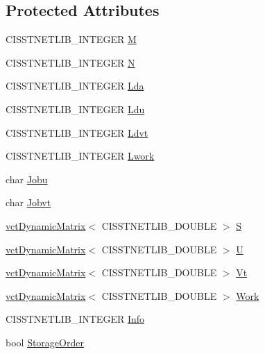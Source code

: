 \subsection*{Protected Attributes}
\begin{DoxyCompactItemize}
\item 
C\+I\+S\+S\+T\+N\+E\+T\+L\+I\+B\+\_\+\+I\+N\+T\+E\+G\+E\+R \hyperlink{classnmr_s_v_d_solver_af16aa65c812236c80f9173748db22acb}{M}
\item 
C\+I\+S\+S\+T\+N\+E\+T\+L\+I\+B\+\_\+\+I\+N\+T\+E\+G\+E\+R \hyperlink{classnmr_s_v_d_solver_aef8ac12080959a681276af72da1bef93}{N}
\item 
C\+I\+S\+S\+T\+N\+E\+T\+L\+I\+B\+\_\+\+I\+N\+T\+E\+G\+E\+R \hyperlink{classnmr_s_v_d_solver_a3811b3b186d6b171c73bb905310e638c}{Lda}
\item 
C\+I\+S\+S\+T\+N\+E\+T\+L\+I\+B\+\_\+\+I\+N\+T\+E\+G\+E\+R \hyperlink{classnmr_s_v_d_solver_aaa2c1ed67903ff66be23a17cd3c3af90}{Ldu}
\item 
C\+I\+S\+S\+T\+N\+E\+T\+L\+I\+B\+\_\+\+I\+N\+T\+E\+G\+E\+R \hyperlink{classnmr_s_v_d_solver_a440639f824e2e44e990760c468e30553}{Ldvt}
\item 
C\+I\+S\+S\+T\+N\+E\+T\+L\+I\+B\+\_\+\+I\+N\+T\+E\+G\+E\+R \hyperlink{classnmr_s_v_d_solver_a99ff6eb1d7fc8ecc1ac950afcc5c90dc}{Lwork}
\item 
char \hyperlink{classnmr_s_v_d_solver_aa1cd31744f3929582fb5de43be96d3e9}{Jobu}
\item 
char \hyperlink{classnmr_s_v_d_solver_ac3ca9ed1369ecb4fcc73ccdb8f443029}{Jobvt}
\item 
\hyperlink{classvct_dynamic_matrix}{vct\+Dynamic\+Matrix}$<$ C\+I\+S\+S\+T\+N\+E\+T\+L\+I\+B\+\_\+\+D\+O\+U\+B\+L\+E $>$ \hyperlink{classnmr_s_v_d_solver_aca07b1c1cace20d92b7d491341bfb9fe}{S}
\item 
\hyperlink{classvct_dynamic_matrix}{vct\+Dynamic\+Matrix}$<$ C\+I\+S\+S\+T\+N\+E\+T\+L\+I\+B\+\_\+\+D\+O\+U\+B\+L\+E $>$ \hyperlink{classnmr_s_v_d_solver_acc19b0a389707d8cc7c592bbce894b61}{U}
\item 
\hyperlink{classvct_dynamic_matrix}{vct\+Dynamic\+Matrix}$<$ C\+I\+S\+S\+T\+N\+E\+T\+L\+I\+B\+\_\+\+D\+O\+U\+B\+L\+E $>$ \hyperlink{classnmr_s_v_d_solver_a095a57197ba4c316b6761b25547b38f0}{Vt}
\item 
\hyperlink{classvct_dynamic_matrix}{vct\+Dynamic\+Matrix}$<$ C\+I\+S\+S\+T\+N\+E\+T\+L\+I\+B\+\_\+\+D\+O\+U\+B\+L\+E $>$ \hyperlink{classnmr_s_v_d_solver_af78f509d3f0c674618f1d40c07c7fdc0}{Work}
\item 
C\+I\+S\+S\+T\+N\+E\+T\+L\+I\+B\+\_\+\+I\+N\+T\+E\+G\+E\+R \hyperlink{classnmr_s_v_d_solver_a31d09d7a13b8917259c42edb13f6198a}{Info}
\item 
bool \hyperlink{classnmr_s_v_d_solver_a9588844c42329b2d4224d397eebaab5c}{Storage\+Order}
\end{DoxyCompactItemize}



